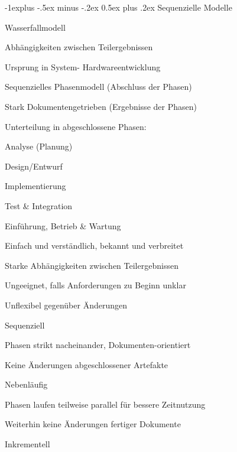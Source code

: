 \documentclass[a4paper]{article}
\makeatletter
\renewcommand{\subsection}{\@startsection{subsection}{2}{0mm}%
                                {-1explus -.5ex minus -.2ex}%
                                {0.5ex plus .2ex}%
                                {\normalfont\normalsize\bfseries}}
\makeatother
\begin{document}
\begin{multicols}{3}
  \subsection{Sequenzielle Modelle}
  \begin{itemize*}
    \item Wasserfallmodell
    \begin{itemize*}
      \item Abhängigkeiten zwischen Teilergebnissen
      \item Ursprung in System- Hardwareentwicklung
      \item Sequenzielles Phasenmodell (Abschluss der Phasen)
      \item Stark Dokumentengetrieben (Ergebnisse der Phasen)
      \item Unterteilung in abgeschlossene Phasen:
      \begin{itemize*}
        \item Analyse (Planung)
        \item Design/Entwurf
        \item Implementierung
        \item Test \& Integration
        \item Einführung, Betrieb \& Wartung
      \end{itemize*}
      \item Einfach und verständlich, bekannt und verbreitet
      \item Starke Abhängigkeiten zwischen Teilergebnissen
      \item Ungeeignet, falls Anforderungen zu Beginn unklar
      \item Unflexibel gegenüber Änderungen
    \end{itemize*}
    \item Sequenziell
    \begin{itemize*}
      \item Phasen strikt nacheinander, Dokumenten-orientiert
      \item Keine Änderungen abgeschlossener Artefakte
    \end{itemize*}
    \item Nebenläufig
    \begin{itemize*}
      \item Phasen laufen teilweise parallel für bessere Zeitnutzung
      \item Weiterhin keine Änderungen fertiger Dokumente
    \end{itemize*}
    \item Inkrementell

\end{itemize*}
\end{multicols}
\end{document}
